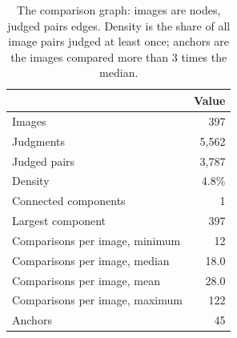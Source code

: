 \begin{table}[htbp]
  \centering
  \caption{The comparison graph: images are nodes, judged pairs edges. Density is the share of all image pairs judged at least once; anchors are the images compared more than 3 times the median.}
  \label{tab:comparison_graph}
  \begin{tabular}{lr}
    \toprule
     & Value \\
    \midrule
    Images & 397 \\
    Judgments & 5,562 \\
    Judged pairs & 3,787 \\
    Density & 4.8\% \\
    Connected components & 1 \\
    Largest component & 397 \\
    Comparisons per image, minimum & 12 \\
    Comparisons per image, median & 18.0 \\
    Comparisons per image, mean & 28.0 \\
    Comparisons per image, maximum & 122 \\
    Anchors & 45 \\
    \bottomrule
  \end{tabular}
\end{table}
